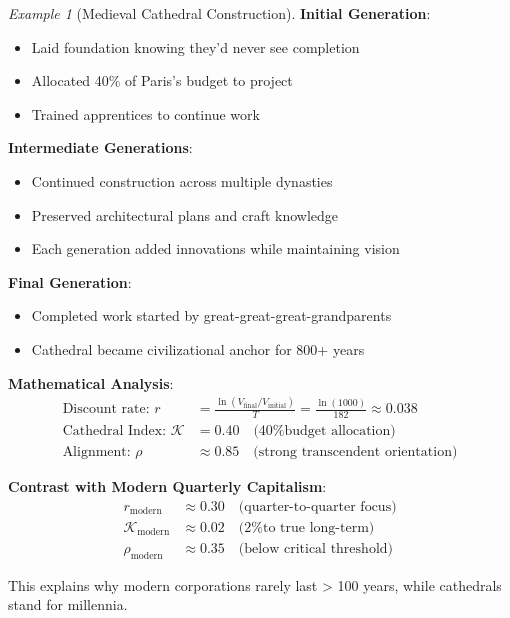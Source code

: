 \documentclass[11pt,a4paper]{article}
\theoremstyle{definition}
\theoremstyle{remark}
\newtheorem{example}{Example}[section]
\begin{document}
\begin{enumerate}
\begin{example}[Medieval Cathedral Construction]
\textbf{Initial Generation}:
\begin{itemize}
    \item Laid foundation knowing they'd never see completion
    \item Allocated 40\% of Paris's budget to project
    \item Trained apprentices to continue work
\end{itemize}

\textbf{Intermediate Generations}:
\begin{itemize}
    \item Continued construction across multiple dynasties
    \item Preserved architectural plans and craft knowledge
    \item Each generation added innovations while maintaining vision
\end{itemize}

\textbf{Final Generation}:
\begin{itemize}
    \item Completed work started by great-great-great-grandparents
    \item Cathedral became civilizational anchor for 800+ years
\end{itemize}

\textbf{Mathematical Analysis}:
\begin{align}
\text{Discount rate: } r &= \frac{\ln(V_{\text{final}}/V_{\text{initial}})}{T} = \frac{\ln(1000)}{182} \approx 0.038 \\
\text{Cathedral Index: } \mathcal{K} &= 0.40 \quad \text{(40\% budget allocation)} \\
\text{Alignment: } \rho &\approx 0.85 \quad \text{(strong transcendent orientation)}
\end{align}

\textbf{Contrast with Modern Quarterly Capitalism}:
\begin{align}
r_{\text{modern}} &\approx 0.30 \quad \text{(quarter-to-quarter focus)} \\
\mathcal{K}_{\text{modern}} &\approx 0.02 \quad \text{(2\% to true long-term)} \\
\rho_{\text{modern}} &\approx 0.35 \quad \text{(below critical threshold)}
\end{align}

This explains why modern corporations rarely last > 100 years, while cathedrals stand for millennia.
\end{example}


\end{enumerate}
\end{document}
